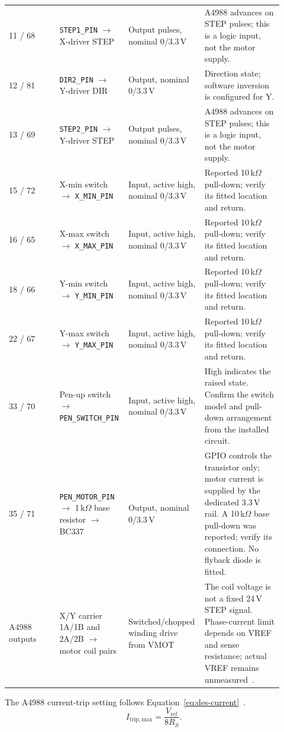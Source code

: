 \begin{longtable}{p{0.18\linewidth}p{0.22\linewidth}p{0.23\linewidth}p{0.29\linewidth}}
11 / 68 & \texttt{STEP1\_PIN} $\rightarrow$ X-driver STEP & Output pulses, nominal 0/3.3\,V & A4988 advances on STEP pulses; this is a logic input, not the motor supply.\\
12 / 81 & \texttt{DIR2\_PIN} $\rightarrow$ Y-driver DIR & Output, nominal 0/3.3\,V & Direction state; software inversion is configured for Y.\\
13 / 69 & \texttt{STEP2\_PIN} $\rightarrow$ Y-driver STEP & Output pulses, nominal 0/3.3\,V & A4988 advances on STEP pulses; this is a logic input, not the motor supply.\\
15 / 72 & X-min switch $\rightarrow$ \texttt{X\_MIN\_PIN} & Input, active high, nominal 0/3.3\,V & Reported 10\,k$\Omega$ pull-down; verify its fitted location and return.\\
16 / 65 & X-max switch $\rightarrow$ \texttt{X\_MAX\_PIN} & Input, active high, nominal 0/3.3\,V & Reported 10\,k$\Omega$ pull-down; verify its fitted location and return.\\
18 / 66 & Y-min switch $\rightarrow$ \texttt{Y\_MIN\_PIN} & Input, active high, nominal 0/3.3\,V & Reported 10\,k$\Omega$ pull-down; verify its fitted location and return.\\
22 / 67 & Y-max switch $\rightarrow$ \texttt{Y\_MAX\_PIN} & Input, active high, nominal 0/3.3\,V & Reported 10\,k$\Omega$ pull-down; verify its fitted location and return.\\
33 / 70 & Pen-up switch $\rightarrow$ \texttt{PEN\_SWITCH\_PIN} & Input, active high, nominal 0/3.3\,V & High indicates the raised state. Confirm the switch model and pull-down arrangement from the installed circuit.\\
35 / 71 & \texttt{PEN\_MOTOR\_PIN} $\rightarrow$ 1\,k$\Omega$ base resistor $\rightarrow$ BC337 & Output, nominal 0/3.3\,V & GPIO controls the transistor only; motor current is supplied by the dedicated 3.3\,V rail. A 10\,k$\Omega$ base pull-down was reported; verify its connection. No flyback diode is fitted.\\
A4988 outputs & X/Y carrier 1A/1B and 2A/2B $\rightarrow$ motor coil pairs & Switched/chopped winding drive from VMOT & The coil voltage is not a fixed 24\,V STEP signal. Phase-current limit depends on VREF and sense resistance; actual VREF remains unmeasured~\cite[PDF pp.~4--5, 9]{a4988ds}.\\
\end{longtable}
\endgroup


The A4988 current-trip setting follows Equation~\ref{eq:des-current}~\cite[p.~9]{a4988ds}.
\begin{equation}
I_{\mathrm{trip,max}}=\frac{V_{\mathrm{ref}}}{8R_S}.
\label{eq:des-current}
\end{equation}

